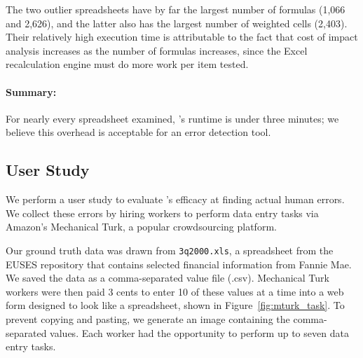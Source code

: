 The two outlier spreadsheets have by far the largest number of formulas
(1,066 and 2,626), and the latter also has the largest number of
weighted cells (2,403). Their relatively high execution time is
attributable to the fact that cost of impact analysis increases as the
number of formulas increases, since the Excel recalculation engine
must do more work per item tested.

\paragraph{Summary:} For nearly every spreadsheet
 examined, \checkcell{}'s runtime is under three minutes; we believe
 this overhead is acceptable for an error detection tool.





\subsection{User Study}
\label{sec:user_study}

We perform a user study to evaluate \checkcell{}'s efficacy at finding
actual human errors. We collect these errors by hiring workers to
perform data entry tasks via Amazon's Mechanical Turk, a popular
crowdsourcing platform.

Our ground truth data was drawn from \texttt{3q2000.xls}, a
spreadsheet from the EUSES repository that contains selected financial
information from Fannie Mae. We saved the data as a comma-separated
value file (.csv). Mechanical Turk workers were then paid 3 cents to
enter 10 of these values at a time into a web form designed to look
like a spreadsheet, shown in Figure~\ref{fig:mturk_task}. To prevent
copying and pasting, we generate an image containing the
comma-separated values.  Each worker had the opportunity to perform up
to seven data entry tasks.

